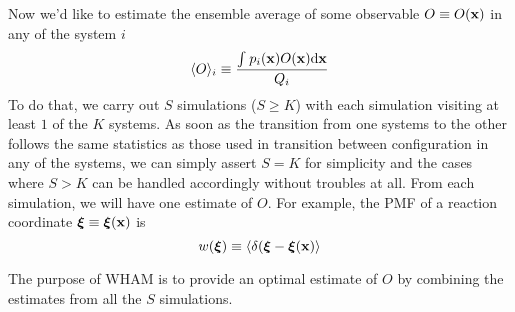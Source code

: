 Now we'd like to estimate the ensemble average of some observable 
$O \equiv O(\mathbf{x})$ in any of the system $i$
\begin{equation}
\langle O \rangle_{i} \equiv \frac{\int_{}^{}{p_{i}(\mathbf{x})O}(\mathbf{x})\mathrm{d}\mathbf{x}}{Q_{i}}
\end{equation}
To do that, we carry out $S$ simulations ($S \ge K$) with each 
simulation visiting at least $1$ of the $K$ systems. As soon as the transition 
from one systems to the other follows the same statistics as those used 
in transition between configuration in any of the systems, we can simply 
assert $S = K$ for simplicity and the cases where $S > K$ can be handled 
accordingly without troubles at all. From each simulation, we will have one 
estimate of $O$. For example, the PMF of a reaction coordinate $\boldsymbol\xi \equiv \boldsymbol\xi(\mathbf{x})$
is
\begin{equation}
\label{eq:PMF}
w(\boldsymbol\xi) \equiv \langle \delta(\boldsymbol\xi - \boldsymbol\xi(\mathbf{x}) \rangle 
\end{equation}

The purpose of WHAM is to provide an optimal estimate of 
$O$ by combining the estimates from all the $S$ simulations. 

